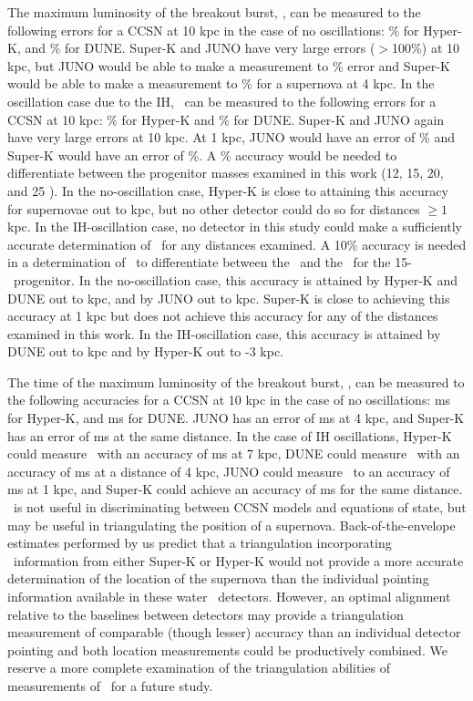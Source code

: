 The maximum luminosity of the breakout burst, \lmax, can be measured
to the following errors for a CCSN at 10 kpc in the case of no
oscillations:  \% for Hyper-K, and \% for DUNE.  
Super-K and JUNO have very large errors ($>$100\%) at
10 kpc, but JUNO would be able to make a measurement to \%
error and Super-K would be able to make a measurement to \%
for a supernova at 4 kpc.  
In the oscillation case due to the IH, \lmax\ can be measured to the
following errors for a CCSN at 10 kpc: \% for Hyper-K and
\% for DUNE.  Super-K and JUNO again have very
large errors at 10 kpc. At 1 kpc, JUNO would have an error of \% 
and Super-K would have an error of \%.
A \% accuracy would be needed to
differentiate between the progenitor masses examined in this work (12,
15, 20, and 25 \Msol).  In the no-oscillation case, 
Hyper-K is close to attaining this accuracy 
for supernovae out to  kpc, but no other
detector could do so for distances ${\geq}1$ kpc.  In the
IH-oscillation case, no detector in this study could make a
sufficiently accurate determination of \lmax\ for any distances examined. 
A 10\% accuracy is
needed in a determination of \lmax\ 
to differentiate between the \ls\ and the \shen\ for the
15-\Msol\ progenitor.  In the no-oscillation case, 
this accuracy is attained by Hyper-K and DUNE out to  kpc, 
 and by JUNO out to \abt 1 kpc.  Super-K is close to achieving this
 accuracy at 1 kpc but does not achieve this accuracy for any of the
 distances examined in this work.
In the IH-oscillation case, this accuracy is attained by DUNE out to
 kpc and by Hyper-K out to \abt 2-3 kpc. 

The time of the maximum luminosity of the breakout burst, \tmax, can
be measured to the following accuracies for a CCSN at 10 kpc in the
case of no oscillations: \abt 1.3 ms for Hyper-K, and \abt 1.5 ms for DUNE.
JUNO has an error of \abt 2 ms at 4 kpc, and Super-K has an error
of \abt 2.5 ms at the same distance.
In the case of IH oscillations, Hyper-K could measure \tmax\ with an
accuracy of \abt 3 ms at 7 kpc, DUNE could measure \tmax\ with an
accuracy of \abt 2 ms at a distance of 4 kpc, JUNO 
could measure \tmax\ to an accuracy of  ms at 1 kpc, and
Super-K could achieve an accuracy of \abt 2 ms for the same distance.
\tmax\ is
not useful in discriminating between CCSN models and equations of
state, but may be useful in triangulating the position of a 
supernova. Back-of-the-envelope estimates performed by us predict that
a triangulation incorporating \tmax\ information from either Super-K
or Hyper-K would not provide a more accurate determination of the
location of the supernova than the individual pointing information
available in these water \cer\ detectors.  However, an optimal
alignment relative to the baselines between detectors may provide a
triangulation measurement of comparable (though lesser) accuracy than an
individual detector pointing and both location measurements could be
productively combined.  We reserve a more complete examination of the
triangulation abilities of measurements of \tmax\ for a future study.


